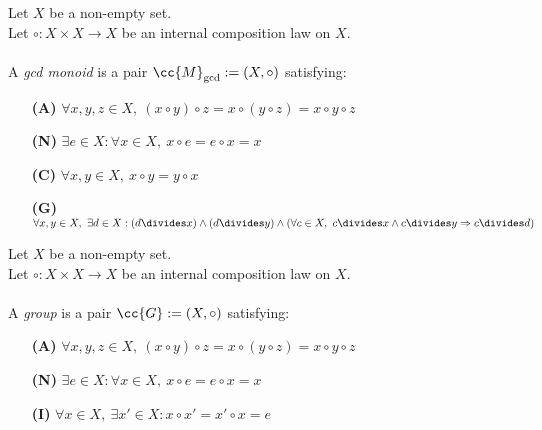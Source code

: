 \begin{definition-pre}
    \label{def:gcd_monoid}
    Let \(X\) be a non-empty set.\\
    Let \(\circ: X\times X \to X\) be an internal composition law on \(X\). \\\\
    A \textit{gcd monoid} is a pair \(\cc{M}_{\gcd}:= (X, \circ)\) satisfying:
    \begin{enumerate}
        \item [\textbf{(A)}] \(\forall x,y,z\in X,\ (x\circ y)\circ z= x\circ (y\circ z) = x\circ y \circ z\)
        \item [\textbf{(N)}] \(\exists e \in X : \forall x \in X,\ x\circ e = e \circ x = x\)
        \item [\textbf{(C)}] \(\forall x,y\in X,\ x\circ y = y\circ x\)
        \item [\textbf{(G)}] \(\forall x,y\in X,\ \exists d \in X : (d\divides x) \land (d\divides y)
                             \land \left(\forall c \in X,\ c\divides x \land c\divides y \Rightarrow c\divides d\right)\)
    \end{enumerate}
\end{definition-pre}

\begin{definition-pre}[Group]
    \label{def:group}
    Let \(X\) be a non-empty set.\\
    Let \(\circ: X\times X \to X\) be an internal composition law on \(X\). \\\\
    A \textit{group} is a pair \(\cc{G}:= (X, \circ)\) satisfying:
    \begin{enumerate}
        \item [\textbf{(A)}] \(\forall x,y,z\in X,\ (x\circ y)\circ z= x\circ (y\circ z) = x\circ y \circ z\)
        \item [\textbf{(N)}] \(\exists e \in X : \forall x \in X,\ x\circ e = e \circ x = x\)
        \item [\textbf{(I)}] \(\forall x \in X,\ \exists x'\in X: x\circ x' = x'\circ x = e\)
    \end{enumerate}
\end{definition-pre}


